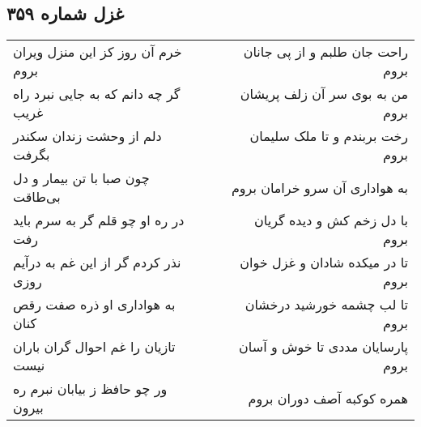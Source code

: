 \begin{center}
\section*{غزل شماره ۳۵۹}
\label{sec:sh359}
\begin{longtable}{l p{0.5cm} r}
خرم آن روز کز این منزل ویران بروم
&&
راحت جان طلبم و از پی جانان بروم
\\
گر چه دانم که به جایی نبرد راه غریب
&&
من به بوی سر آن زلف پریشان بروم
\\
دلم از وحشت زندان سکندر بگرفت
&&
رخت بربندم و تا ملک سلیمان بروم
\\
چون صبا با تن بیمار و دل بی‌طاقت
&&
به هواداری آن سرو خرامان بروم
\\
در ره او چو قلم گر به سرم باید رفت
&&
با دل زخم کش و دیده گریان بروم
\\
نذر کردم گر از این غم به درآیم روزی
&&
تا در میکده شادان و غزل خوان بروم
\\
به هواداری او ذره صفت رقص کنان
&&
تا لب چشمه خورشید درخشان بروم
\\
تازیان را غم احوال گران باران نیست
&&
پارسایان مددی تا خوش و آسان بروم
\\
ور چو حافظ ز بیابان نبرم ره بیرون
&&
همره کوکبه آصف دوران بروم
\\
\end{longtable}
\end{center}
